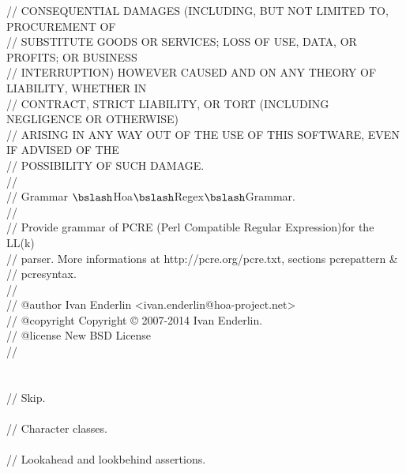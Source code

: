 \begin{bigbigpre}
// CONSEQUENTIAL DAMAGES (INCLUDING, BUT NOT LIMITED TO, PROCUREMENT OF \\
// SUBSTITUTE GOODS OR SERVICES; LOSS OF USE, DATA, OR PROFITS; OR BUSINESS \\
// INTERRUPTION) HOWEVER CAUSED AND ON ANY THEORY OF LIABILITY, WHETHER IN \\
// CONTRACT, STRICT LIABILITY, OR TORT (INCLUDING NEGLIGENCE OR OTHERWISE) \\
// ARISING IN ANY WAY OUT OF THE USE OF THIS SOFTWARE, EVEN IF ADVISED OF THE \\
// POSSIBILITY OF SUCH DAMAGE. \\
// \\
// Grammar \(\bslash\)Hoa\(\bslash\)Regex\(\bslash\)Grammar. \\
// \\
// Provide grammar of PCRE (Perl Compatible Regular Expression)for the LL(k) \\
// parser. More informations at http://pcre.org/pcre.txt, sections pcrepattern & \\
// pcresyntax. \\
// \\
// @author     Ivan Enderlin <ivan.enderlin@hoa-project.net> \\
// @copyright  Copyright © 2007-2014 Ivan Enderlin. \\
// @license    New BSD License \\
// \\
 \\
 \\
// Skip. \\
 \\
// Character classes. \\
 \\
// Lookahead and lookbehind assertions. \\

\end{bigbigpre}
